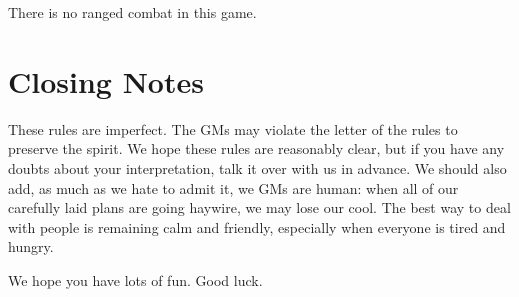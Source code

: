 \documentclass[sheet]{GL2020}
\begin{document}
There is no ranged combat in this game.

\section{Closing Notes}

These rules are imperfect.  The GMs may violate the letter of the rules to preserve the spirit.  We hope these rules are reasonably clear, but if you have any doubts about your interpretation, talk it over with us in advance.  We should also add, as much as we hate to admit it, we GMs are human: when all of our carefully laid plans are going haywire, we may lose our cool.  The best way to deal with people is remaining calm and friendly, especially when everyone is tired and hungry.

We hope you have lots of fun.  Good luck.
\end{document}

